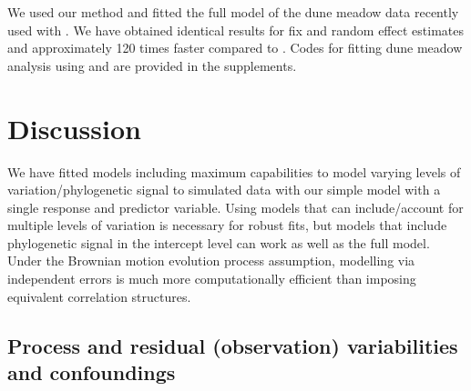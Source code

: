 


We used our method and fitted the full model of the dune meadow data recently used with  \cite{li2017canfun}. 
We have obtained identical results for fix and random effect estimates and approximately 120 times faster compared to . 
Codes for fitting dune meadow analysis using  and  are provided in the supplements. 

\newpage

\section{Discussion}

We have fitted models including maximum capabilities  to model varying levels of variation/phylogenetic signal to simulated data with our simple model with a single response and predictor variable.
Using models that can include/account for multiple levels of variation is necessary for robust fits, but models that include phylogenetic signal in the intercept level can work as well as the full model. 
Under the Brownian motion evolution process assumption, modelling via independent errors is much more computationally efficient than imposing equivalent correlation structures. 

\subsection{Process and residual (observation) variabilities and confoundings}

